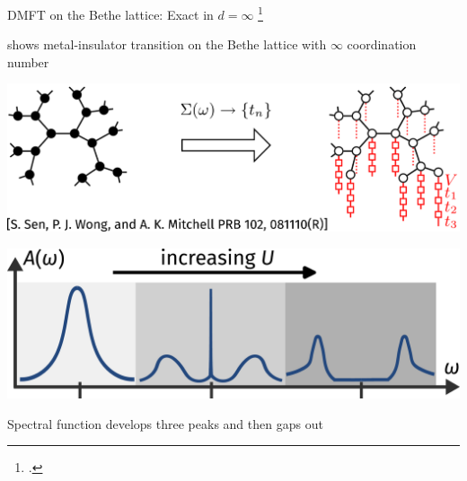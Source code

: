 \documentclass[8pt,aspectratio=169]{beamer}
\begin{document}
\begin{frame}{DMFT on the Bethe lattice: Exact in \(d=\infty\)}
\footcite{metzner_volhardt_1989,kotliar1996,parcollet_2004,maier_2005,kotliar_rmp_2006,ohashi_2008,held_2013,sen_2020}

\begin{itemize}
\begin{minipage}{0.4\textwidth}
\nitem shows \alert{metal-insulator transition} on the Bethe lattice with \(\infty\) coordination number
\end{minipage}
\hspace*{\fill}
\begin{minipage}{0.45\textwidth}
\includegraphics[width=\textwidth]{bethe-lattice.pdf}
\end{minipage}

\vspace*{\fill}

\begin{minipage}{0.45\textwidth}
\includegraphics[width=\textwidth]{dmft-sf.pdf}
\end{minipage}
\hspace*{\fill}
\begin{minipage}{0.4\textwidth}
\nitem Spectral function develops three peaks and then \alert{gaps out}
\end{minipage}

\vspace*{\fill}


\end{itemize}
\end{frame}
\end{document}
